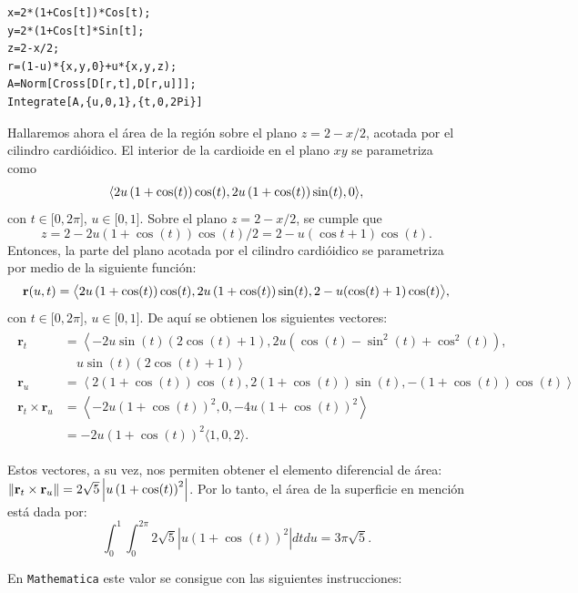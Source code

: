 \begin{tcolorbox}[title=\bf Instrucción en \verb"Mathematica"]
\begin{Verbatim}[formatcom=\letraverbatim]
x=2*(1+Cos[t])*Cos[t);
y=2*(1+Cos[t]*Sin[t];
z=2-x/2;
r=(1-u)*{x,y,0}+u*{x,y,z);
A=Norm[Cross[D[r,t],D[r,u]]];
Integrate[A,{u,0,1},{t,0,2Pi}]
\end{Verbatim}
\end{tcolorbox}

Hallaremos ahora el área de la región sobre el plano $z=2-x/2$, acotada por el cilindro cardióidico.
El interior de la cardioide en el plano $xy$ se parametriza como
\[\langle 2u\left( 1+\cos(t)\right) \cos(t) ,2u\left( 1+\cos(t)\right) \sin(t),0\rangle,\]
con $t\in \lbrack 0,2\pi ]$, $u\in \lbrack 0,1]$.
Sobre el plano $z=2-x/2$, se cumple que
\[z=2-2u\left( 1+\cos(t)\right)\cos(t)/2=2-u\left(\cos t+1\right)\cos(t).\]
Entonces, la parte del plano acotada por el cilindro cardióidico se parametriza por medio de la siguiente función:
\begin{gather*}
{\bf r}(u,t)=\big\langle 2u\left( 1+\cos(t)\right) \cos(t),2u\left(1+\cos(t)\right)\sin(t),2-u(\cos(t)+1)\cos(t) \big\rangle,
\end{gather*}
con $t\in \lbrack 0,2\pi ]$, $u\in \lbrack 0,1]$. De aquí se obtienen los siguientes vectores:
\begin{gather*}
\begin{aligned}
\mathbf{r}_t &= \left\langle -2u\sin(t)(2\cos(t) + 1), 2u\left(\cos(t) - \sin^2(t) + \cos^2(t)\right), \right. \\
&\quad \left. u\sin(t)(2\cos(t) + 1) \right\rangle \\
\mathbf{r}_u &= \left\langle 2(1 + \cos(t))\cos(t), 2(1 + \cos(t))\sin(t), -(1 + \cos(t))\cos(t) \right\rangle \\
\mathbf{r}_t \times \mathbf{r}_u &= \left\langle -2u(1 + \cos(t))^2, 0, -4u(1 + \cos(t))^2 \right\rangle \\
&= -2u(1 + \cos(t))^2 \langle 1, 0, 2 \rangle.
\end{aligned}
\end{gather*}

Estos vectores, a su vez, nos permiten obtener el elemento diferencial de área:
$\left\|  {\bf r}_{t}\times {\bf r}_{u}\right\|= 2\sqrt{5}\left|u\left( 1+\cos(t)\right)^{2}\right| $. Por lo tanto, el área de la superficie en mención está dada por:
\[\int_{0}^{1}\int_{0}^{2\pi }2\sqrt{5}\left| u\left( 1+\cos (t) \right) ^{2}\right|
dtdu= 3\pi \sqrt{5}.\]

En \verb"Mathematica" este valor se consigue con las siguientes instrucciones:

